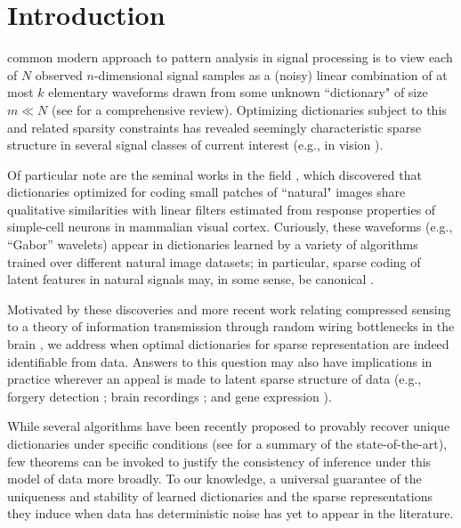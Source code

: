 \documentclass[journal, twocolumn]{IEEEtran}
\begin{document}
\section{Introduction}\label{Intro}
common modern approach to pattern analysis in signal processing is to view each of $N$ observed $n$-dimensional signal samples as a (noisy) linear combination of at most $k$ elementary waveforms drawn from some unknown ``dictionary" of size $m \ll N$ (see \cite{Zhang15} for a comprehensive review). 
Optimizing dictionaries subject to this and related sparsity constraints has revealed seemingly characteristic sparse structure in several signal classes of current interest (e.g., in vision \cite{wang2015sparse}). 

Of particular note are the seminal works in the field \cite{Olshausen96, hurri1996image, bell1997independent, van1998independent}, which discovered that dictionaries optimized for coding small patches of ``natural" images share qualitative similarities with linear filters estimated from response properties of simple-cell neurons in mammalian visual cortex. Curiously, these waveforms (e.g., ``Gabor'' wavelets) appear in dictionaries learned by a variety of algorithms trained over different natural image datasets; in particular, sparse coding of  latent features in natural signals may, in some sense, be canonical \cite{donoho2001can}.

Motivated by these discoveries and more recent work relating compressed sensing \cite{eldar2012compressed} to a theory of information transmission through random wiring bottlenecks in the brain \cite{Isely10}, we address when optimal dictionaries for sparse representation are indeed identifiable from data. Answers to this question may also have implications in practice wherever an appeal is made to latent sparse structure of data (e.g., forgery detection \cite{hughes2010, olshausen2010applied}; brain recordings \cite{jung2001imaging, agarwal2014spatially, lee2016sparse}; and gene expression \cite{wu2016stability}). 

While several algorithms have been recently proposed to provably recover unique dictionaries under specific conditions (see \cite[Sec.~I-E]{Sun16} for a summary of the state-of-the-art), few theorems can be invoked to justify the consistency of inference under this model of data more broadly. To our knowledge, a universal guarantee of the uniqueness and stability of learned dictionaries and the sparse representations they induce when data has deterministic noise has yet to appear in the literature.
\end{document}

